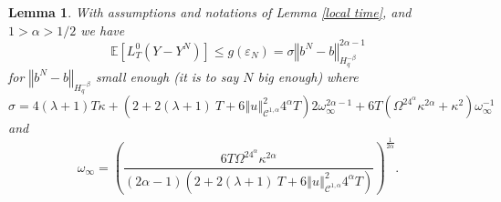 \documentclass[11pt]{article}
\newtheorem{lem}[theo]{Lemma}
\newcommand{\norme}[1]{\left\Vert #1\right\Vert}
\newcommand{\E}{\mathbb{E}}
\begin{document}
\begin{lem}\label{key lemma}
    With assumptions and notations of Lemma \ref{local time}, and $1>\alpha>1/2$ we have
    \begin{equation}
    \E\left[L^0_T(Y-Y^N)\right]\leq g(\varepsilon_N) = \sigma\norme{b^N-b}_{H^{-\beta}_{q}}^{2\alpha-1}
    \end{equation}
    for $\norme{b^N-b}_{H^{-\beta}_{q}}$ small enough (it is to say $N$ big enough) where \begin{equation*}
    \sigma = 4(\lambda + 1)T\kappa + \left(2 + 2(\lambda + 1)\ T + 6\norme{u}_{\mathcal{C}^{1,\alpha}}^2 4^{\alpha}T\right) 2\omega_\infty^{2\alpha-1} + 6T\left(\Omega^24^{\alpha}\kappa^{2\alpha} +\kappa^2\right)\omega_\infty^{-1}
    \end{equation*} and \begin{equation*}
    \omega_\infty=\left(\frac{6T\Omega^24^{\alpha}\kappa^{2\alpha} }{(2\alpha-1)\left(2 + 2(\lambda + 1)\ T + 6\norme{u}_{\mathcal{C}^{1,\alpha}}^2 4^{\alpha}T\right)}\right)^{\frac{1}{2\alpha}}.
    \end{equation*}
\end{lem}
\end{document}
